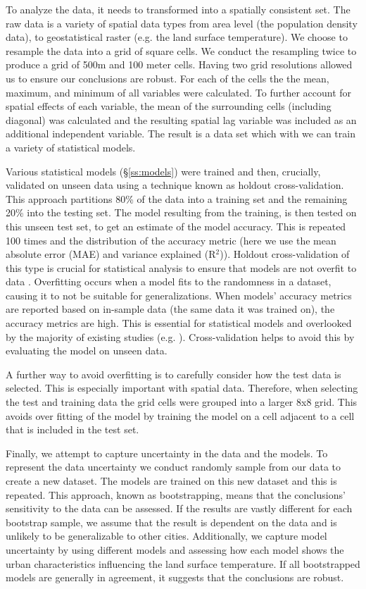 \documentclass[final,3p,times,twocolumn,sort&compress]{elsarticle}
\begin{document}
To analyze the data, it needs to transformed into a spatially consistent set.
The raw data is a variety of spatial data types from area level (the population density data), to geostatistical raster (e.g. the land surface temperature).
We choose to resample the data into a grid of square cells.
We conduct the resampling twice to produce a grid of 500m and 100 meter cells. 
Having two grid resolutions allowed us to ensure our conclusions are robust.
For each of the cells the the mean, maximum, and minimum of all variables were calculated. 
To further account for spatial effects of each variable, the mean of the surrounding cells (including diagonal) was calculated and the resulting spatial lag variable was included as an additional independent variable. 
The result is a data set which with we can train a variety of statistical models.

Various statistical models (\S \ref{ss:models}) were trained and then, crucially, validated on unseen data using a technique known as holdout cross-validation. 
This approach partitions 80\% of the data into a training set and the remaining 20\% into the testing set.
The model resulting from the training, is then tested on this unseen test set, to get an estimate of the model accuracy.
This is repeated 100 times and the distribution of the accuracy metric (here we use the mean absolute error (MAE) and variance explained (R$^2$)).
Holdout cross-validation of this type is crucial for statistical analysis to ensure that models are not overfit to data \cite{Geron2017-ek}.
Overfitting occurs when a model fits to the randomness in a dataset, causing it to not be suitable for generalizations. 
When models' accuracy metrics are reported based on in-sample data (the same data it was trained on), the accuracy metrics are high.
This is essential for statistical models and overlooked by the majority of existing studies (e.g. \cite{Zhou2014-wc, Peng2018-cp, Chun2017-mm, Chun2018-so,Wang2019-tree}).
Cross-validation helps to avoid this by evaluating the model on unseen data.

A further way to avoid overfitting is to carefully consider how the test data is selected.
This is especially important with spatial data.
Therefore, when selecting the test and training data the grid cells were grouped into a larger 8x8 grid.
This avoids over fitting of the model by training the model on a cell adjacent to a cell that is included in the test set.

Finally, we attempt to capture uncertainty in the data and the models. 
To represent the data uncertainty we conduct randomly sample from our data to create a new dataset.
The models are trained on this new dataset and this is repeated.
This approach, known as bootstrapping, means that the conclusions' sensitivity to the data can be assessed.
If the results are vastly different for each bootstrap sample, we assume that the result is dependent on the data and is unlikely to be generalizable to other cities.
Additionally, we capture model uncertainty by using different models and assessing how each model shows the urban characteristics influencing the land surface temperature.
If all bootstrapped models are generally in agreement, it suggests that the conclusions are robust.
\end{document}
